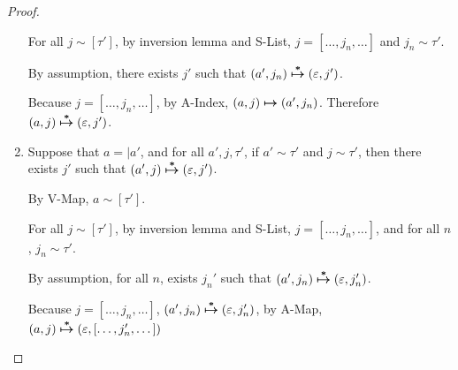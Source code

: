\documentclass[11pt]{article}
\newcommand{\matches}[2]{{#1}\sim{#2}}   %
\begin{document}
\begin{proof}
\begin{enumerate}
          For all $\matches{j}{[\tau']}$, by inversion lemma and S-List, $j=[\dots,j_n,\dots]$ and $\matches{j_n}{\tau'}$.

          By assumption, there exists $j'$ such that $(a',j_n) \boldsymbol{\overset{*}{\mapsto}} (\varepsilon,j')$.

          Because $j=[\dots,j_n,\dots]$, by A-Index, $(a,j) \boldsymbol{\mapsto} (a',j_n)$. Therefore $(a,j) \boldsymbol{\overset{*}{\mapsto}} (\varepsilon,j')$.
    \item Suppose that $a=|a'$, and for all $a',j,\tau'$, if $\matches{a'}{\tau'}$ and $\matches{j}{\tau'}$, then there exists $j'$ such that $(a',j) \boldsymbol{\overset{*}{\mapsto}} (\varepsilon,j')$.

          By V-Map, $\matches{a}{[\tau']}$.

          For all $\matches{j}{[\tau']}$, by inversion lemma and S-List, $j=[\dots,j_n,\dots]$, and for all $n$, $\matches{j_n}{\tau'}$.

          By assumption, for all $n$, exists $j_n'$ such that $(a',j_n) \boldsymbol{\overset{*}{\mapsto}} (\varepsilon,j_n')$.

          Because $j=[\dots,j_n,\dots]$, $(a',j_n) \boldsymbol{\overset{*}{\mapsto}} (\varepsilon,j_n')$, by A-Map, $(a,j) \boldsymbol{\overset{*}{\mapsto}} (\varepsilon,[\dots,j_n',\dots])$
  \end{enumerate}
\end{proof}
\end{document}
